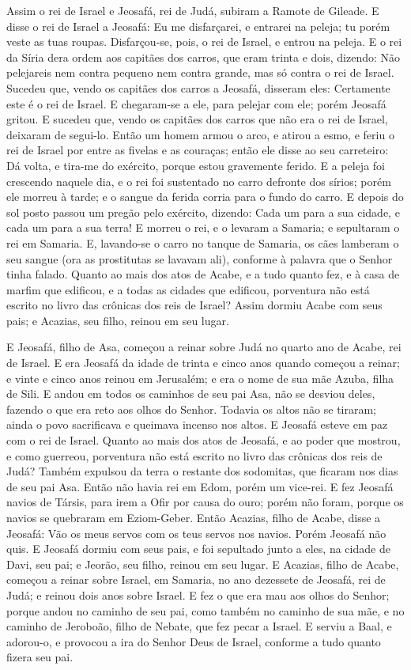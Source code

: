 Assim o rei de Israel e Jeosafá, rei de Judá, subiram a Ramote de
Gileade. E disse o rei de Israel a Jeosafá: Eu me
disfarçarei, e entrarei na peleja; tu porém veste as tuas roupas.
Disfarçou-se, pois, o rei de Israel, e entrou na peleja. E o
rei da Síria dera ordem aos capitães dos carros, que eram trinta e
dois, dizendo: Não pelejareis nem contra pequeno nem contra grande,
mas só contra o rei de Israel. Sucedeu que, vendo os capitães
dos carros a Jeosafá, disseram eles: Certamente este é o rei de
Israel. E chegaram-se a ele, para pelejar com ele; porém Jeosafá
gritou. E sucedeu que, vendo os capitães dos carros que não
era o rei de Israel, deixaram de segui-lo. Então um homem
armou o arco, e atirou a esmo, e feriu o rei de Israel por entre as
fivelas e as couraças; então ele disse ao seu carreteiro: Dá volta,
e tira-me do exército, porque estou gravemente ferido. E a
peleja foi crescendo naquele dia, e o rei foi sustentado no carro
defronte dos sírios; porém ele morreu à tarde; e o sangue da ferida
corria para o fundo do carro. E depois do sol posto passou um
pregão pelo exército, dizendo: Cada um para a sua cidade, e cada um
para a sua terra! E morreu o rei, e o levaram a Samaria; e
sepultaram o rei em Samaria. E, lavando-se o carro no tanque
de Samaria, os cães lamberam o seu sangue (ora as prostitutas se
lavavam ali), conforme à palavra que o Senhor tinha falado.
Quanto ao mais dos atos de Acabe, e a tudo quanto fez, e à
casa de marfim que edificou, e a todas as cidades que edificou,
porventura não está escrito no livro das crônicas dos reis de
Israel? Assim dormiu Acabe com seus pais; e Acazias, seu
filho, reinou em seu lugar.

E Jeosafá, filho de Asa, começou a reinar sobre Judá no quarto
ano de Acabe, rei de Israel. E era Jeosafá da idade de trinta
e cinco anos quando começou a reinar; e vinte e cinco anos reinou em
Jerusalém; e era o nome de sua mãe Azuba, filha de Sili. E
andou em todos os caminhos de seu pai Asa, não se desviou deles,
fazendo o que era reto aos olhos do Senhor. Todavia os altos
não se tiraram; ainda o povo sacrificava e queimava incenso nos
altos. E Jeosafá esteve em paz com o rei de Israel.
Quanto ao mais dos atos de Jeosafá, e ao poder que mostrou, e
como guerreou, porventura não está escrito no livro das crônicas dos
reis de Judá? Também expulsou da terra o restante dos
sodomitas, que ficaram nos dias de seu pai Asa. Então não
havia rei em Edom, porém um vice-rei. E fez Jeosafá navios de
Társis, para irem a Ofir por causa do ouro; porém não foram, porque
os navios se quebraram em Eziom-Geber. Então Acazias, filho
de Acabe, disse a Jeosafá: Vão os meus servos com os teus servos nos
navios. Porém Jeosafá não quis. E Jeosafá dormiu com seus
pais, e foi sepultado junto a eles, na cidade de Davi, seu pai; e
Jeorão, seu filho, reinou em seu lugar. E Acazias, filho de
Acabe, começou a reinar sobre Israel, em Samaria, no ano dezessete
de Jeosafá, rei de Judá; e reinou dois anos sobre Israel. E
fez o que era mau aos olhos do Senhor; porque andou no caminho de
seu pai, como também no caminho de sua mãe, e no caminho de
Jeroboão, filho de Nebate, que fez pecar a Israel. E serviu a
Baal, e adorou-o, e provocou a ira do Senhor Deus de Israel,
conforme a tudo quanto fizera seu pai.

